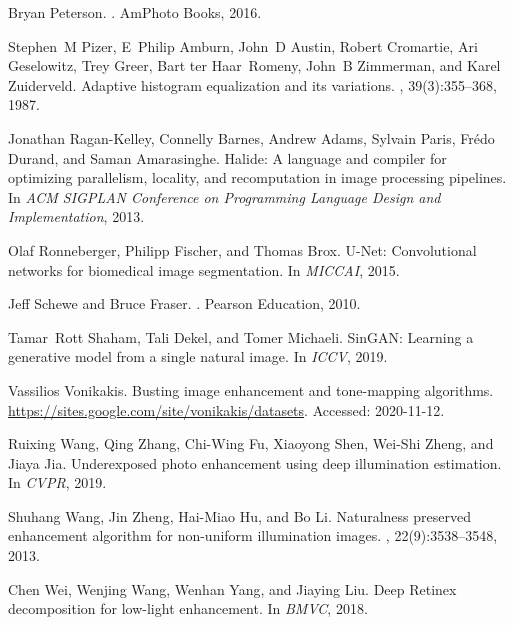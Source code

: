\documentclass[final]{cvpr}
\begin{document}
{\begin{thebibliography}{10}
Bryan Peterson.
.
\newblock AmPhoto {B}ooks, 2016.

Stephen~M Pizer, E~Philip Amburn, John~D Austin, Robert Cromartie, Ari
  Geselowitz, Trey Greer, Bart ter Haar~Romeny, John~B Zimmerman, and Karel
  Zuiderveld.
\newblock Adaptive histogram equalization and its variations.
,
  39(3):355--368, 1987.

Jonathan Ragan-Kelley, Connelly Barnes, Andrew Adams, Sylvain Paris, Fr\'{e}do
  Durand, and Saman Amarasinghe.
\newblock Halide: {A} language and compiler for optimizing parallelism,
  locality, and recomputation in image processing pipelines.
\newblock In {\em ACM SIGPLAN Conference on Programming Language Design and
  Implementation}, 2013.

Olaf Ronneberger, Philipp Fischer, and Thomas Brox.
\newblock U-{N}et: {C}onvolutional networks for biomedical image segmentation.
\newblock In {\em MICCAI}, 2015.

Jeff Schewe and Bruce Fraser.
.
\newblock Pearson Education, 2010.

Tamar~Rott Shaham, Tali Dekel, and Tomer Michaeli.
\newblock Sin{G}{A}{N}: {L}earning a generative model from a single natural
  image.
\newblock In {\em ICCV}, 2019.

Vassilios Vonikakis.
\newblock Busting image enhancement and tone-mapping algorithms.
\newblock \url{https://sites.google.com/site/vonikakis/datasets}.
\newblock Accessed: 2020-11-12.

Ruixing Wang, Qing Zhang, Chi-Wing Fu, Xiaoyong Shen, Wei-Shi Zheng, and Jiaya
  Jia.
\newblock Underexposed photo enhancement using deep illumination estimation.
\newblock In {\em CVPR}, 2019.

Shuhang Wang, Jin Zheng, Hai-Miao Hu, and Bo Li.
\newblock Naturalness preserved enhancement algorithm for non-uniform
  illumination images.
, 22(9):3538--3548, 2013.

Chen Wei, Wenjing Wang, Wenhan Yang, and Jiaying Liu.
\newblock Deep {R}etinex decomposition for low-light enhancement.
\newblock In {\em BMVC}, 2018.


\end{thebibliography}}
\end{document}
